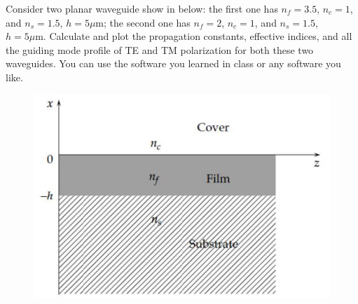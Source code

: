 \documentclass{assignment}
\begin{document}
\begin{prob}
    Consider two planar waveguide show in below: the first one has $n_f=3.5$, $n_c=1$, and $n_s=1.5$, $h=5\mu\mathrm{m}$; the second one has $n_f=2$, $n_c=1$, and $n_s=1.5$, $h=5\mu\mathrm{m}$. Calculate and plot the propagation constants, effective indices, and all the guiding mode profile of TE and TM polarization for both these two waveguides. You can use the software you learned in class or any software you like.
    \begin{figure}[h]
        \centering
        \includegraphics[width=.5\columnwidth]{Assignment-1-Problem-1.jpg}
    \end{figure}
\end{prob}
\end{document}
